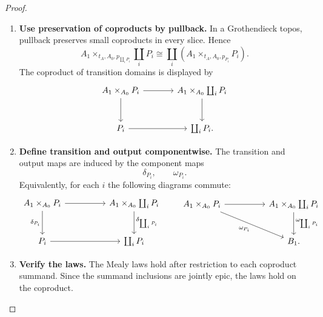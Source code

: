 \begin{proof}
    \leavevmode
    \begin{enumerate}
        \item \textbf{Use preservation of coproducts by pullback.}
        In a Grothendieck topos, pullback preserves small coproducts in every
        slice. Hence
        \[
            A_1\times_{t_A,A_0,p_{\coprod_iP_i}}
            \coprod_iP_i
            \cong
            \coprod_i
            \left(
                A_1\times_{t_A,A_0,p_{P_i}}P_i
            \right).
        \]
        The coproduct of transition domains is displayed by
        \[
        \begin{tikzcd}[column sep=large, row sep=large]
            A_1\times_{A_0}P_i
                \arrow[r]
                \arrow[d]
            &
            A_1\times_{A_0}\coprod_iP_i
                \arrow[d]
            \\
            P_i
                \arrow[r]
            &
            \coprod_iP_i .
        \end{tikzcd}
        \]

        \item \textbf{Define transition and output componentwise.}
        The transition and output maps are induced by the component maps
        \[
            \delta_{P_i},
            \qquad
            \omega_{P_i}.
        \]
        Equivalently, for each \(i\) the following diagrams commute:
        \[
        \begin{tikzcd}[column sep=huge, row sep=large]
            A_1\times_{A_0}P_i
                \arrow[r]
                \arrow[d, "\delta_{P_i}"']
            &
            A_1\times_{A_0}\coprod_iP_i
                \arrow[d, "\delta_{\coprod_iP_i}"]
            \\
            P_i
                \arrow[r]
            &
            \coprod_iP_i
        \end{tikzcd}
        \qquad
        \begin{tikzcd}[column sep=huge, row sep=large]
            A_1\times_{A_0}P_i
                \arrow[r]
                \arrow[dr, "\omega_{P_i}"']
            &
            A_1\times_{A_0}\coprod_iP_i
                \arrow[d, "\omega_{\coprod_iP_i}"]
            \\
            &
            B_1 .
        \end{tikzcd}
        \]

        \item \textbf{Verify the laws.}
        The Mealy laws hold after restriction to each coproduct summand. Since
        the summand inclusions are jointly epic, the laws hold on the
        coproduct.


\end{enumerate}
\end{proof}
